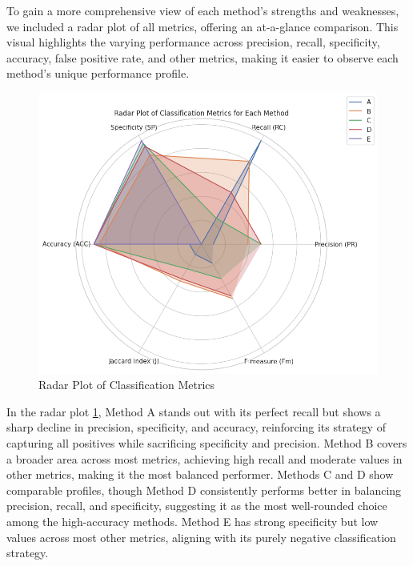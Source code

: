 \documentclass{article}
\begin{document}
To gain a more comprehensive view of each method's strengths and weaknesses, we included a radar plot of all metrics, offering an at-a-glance comparison. This visual highlights the varying performance across precision, recall, specificity, accuracy, false positive rate, and other metrics, making it easier to observe each method’s unique performance profile.
\\

\begin{figure}[H]
	
	\centering
	\includegraphics[width=\textwidth]{images/radar.png}
	\caption{Radar Plot of Classification Metrics}
	\label{fig:radar}
\end{figure}

In the radar plot \ref{fig:radar}, Method A stands out with its perfect recall but shows a sharp decline in precision, specificity, and accuracy, reinforcing its strategy of capturing all positives while sacrificing specificity and precision. Method B covers a broader area across most metrics, achieving high recall and moderate values in other metrics, making it the most balanced performer. Methods C and D show comparable profiles, though Method D consistently performs better in balancing precision, recall, and specificity, suggesting it as the most well-rounded choice among the high-accuracy methods. Method E has strong specificity but low values across most other metrics, aligning with its purely negative classification strategy.
\\
\end{document}

